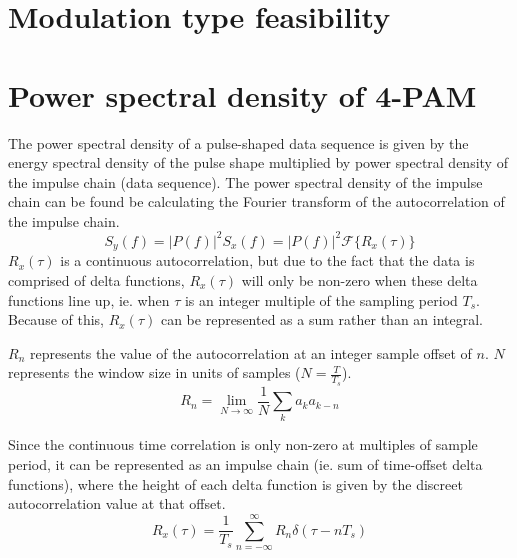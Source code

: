 \documentclass[11pt]{article}
\begin{document}

\newpage
\section{Modulation type feasibility}

\section{Power spectral density of 4-PAM}\label{rect_psd_section}
The power spectral density of a pulse-shaped data sequence is given by the
energy spectral density of the pulse shape multiplied by power spectral density
of the impulse chain (data sequence). The power spectral density of the impulse
chain can be found be calculating the Fourier transform of the autocorrelation
of the impulse chain.
\begin{equation}
    S_y(f) = |P(f)|^2S_x(f) = |P(f)|^2 \mathcal{F} \{ R_x(\tau) \}
\end{equation}
$R_x(\tau)$ is a continuous autocorrelation, but due to the fact that the data
is comprised of delta functions, $R_x(\tau)$ will only be non-zero when these
delta functions line up, ie. when $\tau$ is an integer multiple of the sampling
period $T_s$. Because of this, $R_x(\tau)$ can be represented as a sum rather
than an integral.

$R_n$ represents the value of the autocorrelation at an integer sample offset of
$n$. $N$ represents the window size in units of samples ($N = \frac{T}{T_s}$).
\begin{equation}\label{rn}
    R_n = \lim_{N \to \infty}  \frac{1}{N} \sum_{k} a_k a_{k-n}
\end{equation}

Since the continuous time correlation is only non-zero at multiples of sample
period, it can be represented as an impulse chain (ie. sum of time-offset delta
functions), where the height of each delta function is given by the discreet
autocorrelation value at that offset.
\begin{equation}\label{autocorr}
    R_x(\tau) = \frac{1}{T_s} \sum_{n=-\infty}^{\infty} R_n \delta(\tau - nT_s)
\end{equation}
\end{document}

